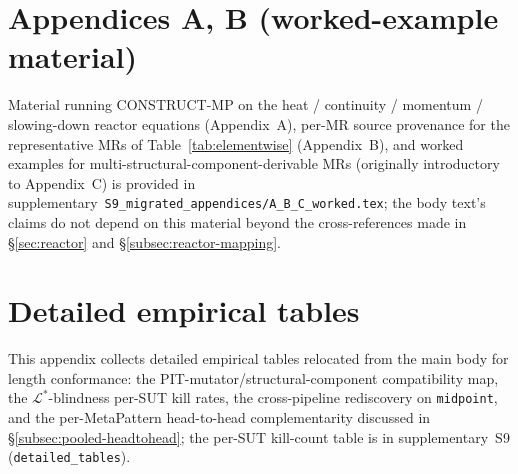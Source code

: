 \documentclass[acmsmall,screen,review]{acmart}
\begin{document}
\clearpage
\appendix

\section*{Appendices A, B (worked-example material)}
\label{app:moved-A-B}
Material running CONSTRUCT-MP on the heat / continuity / momentum / slowing-down reactor equations (Appendix~A), per-MR source provenance for the representative MRs of Table~\ref{tab:elementwise} (Appendix~B), and worked examples for multi-structural-component-derivable MRs (originally introductory to Appendix~C) is provided in supplementary~\texttt{S9\_migrated\_appendices/A\_B\_C\_worked.tex}; the body text's claims do not depend on this material beyond the cross-references made in \S\ref{sec:reactor} and \S\ref{subsec:reactor-mapping}.

\section{Detailed empirical tables}
\label{app:detailed-tables}
This appendix collects detailed empirical tables relocated from the main body for length conformance: the PIT-mutator/structural-component compatibility map, the $\mathcal{L}^{*}$-blindness per-SUT kill rates, the cross-pipeline rediscovery on \texttt{midpoint}, and the per-MetaPattern head-to-head complementarity discussed in \S\ref{subsec:pooled-headtohead}; the per-SUT kill-count table is in supplementary~S9 (\texttt{detailed\_tables}).
\end{document}
